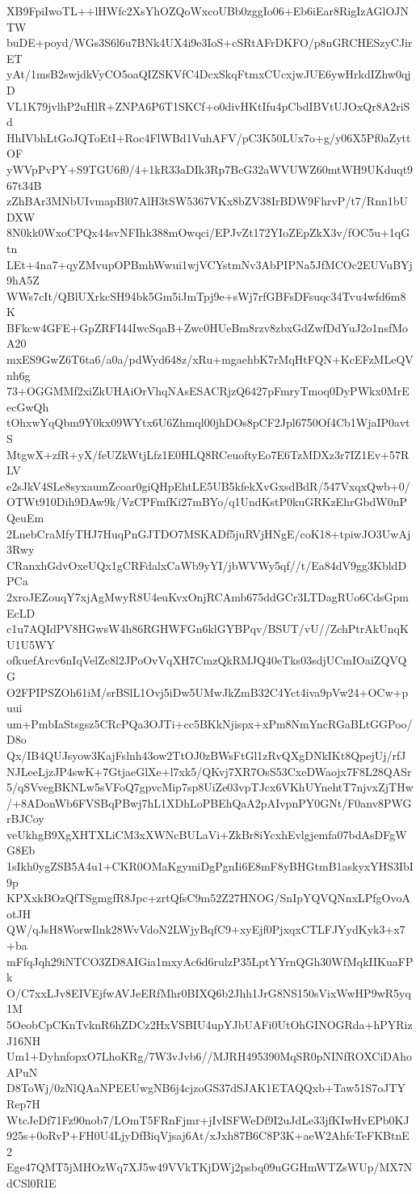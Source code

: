 XB9FpiIwoTL++lHWfc2XsYhOZQoWxcoUBb0zggIo06+Eb6iEar8RigIzAGlOJNTW
buDE+poyd/WGs3S6l6u7BNk4UX4i9e3IoS+cSRtAFrDKFO/p8nGRCHESzyCJirET
yAt/1msB2swjdkVyCO5oaQIZSKVfC4DcxSkqFtmxCUcxjwJUE6ywHrkdIZhw0qjD
VL1K79jvlhP2uHlR+ZNPA6P6T1SKCf+o0divHKtIfu4pCbdIBVtUJOxQr8A2riSd
HhIVbhLtGoJQToEtI+Roc4FlWBd1VuhAFV/pC3K50LUx7o+g/y06X5Pf0aZyttOF
yWVpPvPY+S9TGU6f0/4+1kR33aDIk3Rp7BcG32aWVUWZ60mtWH9UKduqt967t34B
zZhBAr3MNbUIvmapBl07AlH3tSW5367VKx8bZV38IrBDW9FhrvP/t7/Rnn1bUDXW
8N0kk0WxoCPQx44svNFIhk388mOwqci/EPJvZt172YIoZEpZkX3v/fOC5u+1qGtn
LEt+4na7+qyZMvupOPBmhWwui1wjVCYstmNv3AbPIPNa5JfMCOc2EUVuBYj9hA5Z
WWs7cIt/QBlUXrkcSH94bk5Gm5iJmTpj9e+sWj7rfGBFsDFsuqc34Tvu4wfd6m8K
BFkcw4GFE+GpZRFI44IwcSqaB+Zwc0HUeBm8rzv8zbxGdZwfDdYuJ2o1nsfMoA20
mxES9GwZ6T6ta6/a0a/pdWyd648z/xRu+mgaehbK7rMqHtFQN+KcEFzMLeQVnh6g
73+OGGMMf2xiZkUHAiOrVhqNAsESACRjzQ6427pFmryTmoq0DyPWkx0MrEecGwQh
tOhxwYqQbm9Y0kx09WYtx6U6Zhmql00jhDOs8pCF2Jpl6750Of4Cb1WjaIP0avtS
MtgwX+zfR+yX/feUZkWtjLfz1E0HLQ8RCeuoftyEo7E6TzMDXz3r7IZ1Ev+57RLV
e2sJkV4SLe8syxaumZcoar0giQHpEhtLE5UB5kfekXvGxsdBdR/547VxqxQwb+0/
OTWt910Dih9DAw9k/VzCPFmfKi27mBYo/q1UndKstP0kuGRKzEhrGbdW0nPQeuEm
2LnebCraMfyTHJ7HuqPnGJTDO7MSKADf5juRVjHNgE/coK18+tpiwJO3UwAj3Rwy
CRanxhGdvOxeUQx1gCRFdalxCaWb9yYI/jbWVWy5qf//t/Ea84dV9gg3KbldDPCa
2xroJEZouqY7xjAgMwyR8U4euKvxOnjRCAmb675ddGCr3LTDagRUo6CdsGpmEcLD
c1u7AQIdPV8HGwsW4h86RGHWFGn6klGYBPqv/BSUT/vU//ZchPtrAkUnqKU1U5WY
ofkuefArcv6nIqVelZc8l2JPoOvVqXH7CmzQkRMJQ40eTks03sdjUCmIOaiZQVQG
O2FPIPSZOh61iM/srBSlL1Ovj5iDw5UMwJkZmB32C4Yct4iva9pVw24+OCw+puui
um+PmbIaStsgsz5CRcPQa3OJTi+cc5BKkNjispx+xPm8NmYncRGaBLtGGPoo/D8o
Qx/IB4QUJsyow3KajFslnh43ow2TtOJ0zBWsFtGl1zRvQXgDNkIKt8QpejUj/rfJ
NJLeeLjzJP4swK+7GtjaeGlXe+l7xk5/QKvj7XR7OsS53CxeDWaojx7F8L28QASr
5/qSVvegBKNLw5sVFoQ7gpvcMip7sp8UiZe03vpTJcx6VKhUYnehtT7njvxZjTHw
/+8ADonWb6FVSBqPBwj7hL1XDhLoPBEhQaA2pAIvpnPY0GNt/F0anv8PWGrBJCoy
veUkhgB9XgXHTXLiCM3xXWNcBULaVi+ZkBr8iYcxhEvlgjemfa07bdAsDFgWG8Eb
1sIkh0ygZSB5A4u1+CKR0OMaKgymiDgPgnIi6E8mF8yBHGtmB1askyxYHS3IbI9p
KPXxkBOzQfTSgmgfR8Jpc+zrtQfsC9m52Z27HNOG/SnIpYQVQNnxLPfgOvoAotJH
QW/qJsH8WorwIlnk28WvVdoN2LWjyBqfC9+xyEjf0PjxqxCTLFJYydKyk3+x7+ba
mFfqJqh29iNTCO3ZD8AIGia1mxyAc6d6rulzP35LptYYrnQGh30WfMqkIIKuaFPk
O/C7xxLJv8EIVEjfwAVJeERfMhr0BIXQ6b2Jhh1JrG8NS150sVixWwHP9wR5yq1M
5OeobCpCKnTvknR6hZDCz2HxVSBIU4upYJbUAFi0UtOhGINOGRda+hPYRizJ16NH
Um1+DyhnfopxO7LhoKRg/7W3vJvb6//MJRH495390MqSR0pNINfROXCiDAhoAPuN
D8ToWj/0zNlQAaNPEEUwgNB6j4cjzoGS37dSJAK1ETAQQxb+Taw51S7oJTYRep7H
WtcJeDf71Fz90nob7/LOmT5FRnFjmr+jIvISFWeDf9I2uJdLe33jfKIwHvEPb0KJ
925s+0oRvP+FH0U4LjyDfBiqVjsaj6At/xJxh87B6C8P3K+aeW2AhfcTeFKBtnE2
Ege47QMT5jMHOzWq7XJ5w49VVkTKjDWj2psbq09uGGHmWTZsWUp/MX7NdCSl0RIE
